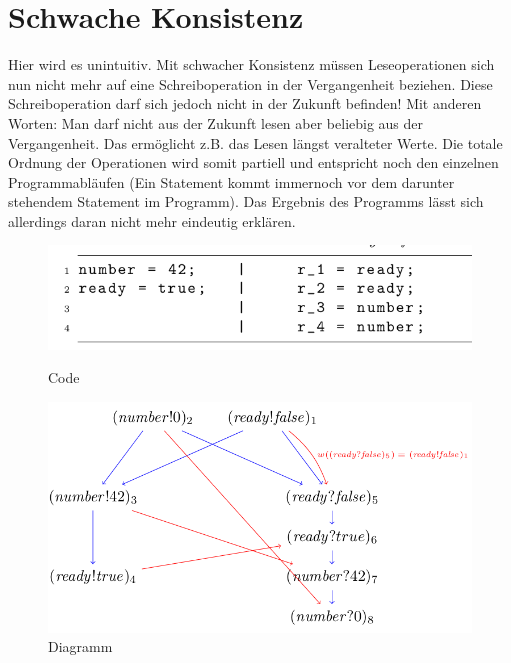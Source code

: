 \documentclass[a4paper,10pt, oneside]{book}
\begin{document}
\section{Schwache Konsistenz}
Hier wird es unintuitiv. Mit schwacher Konsistenz müssen Leseoperationen sich nun nicht mehr auf eine Schreiboperation in der Vergangenheit beziehen. Diese Schreiboperation darf sich jedoch nicht in der Zukunft befinden! Mit anderen Worten: Man darf nicht aus der Zukunft lesen aber beliebig aus der Vergangenheit. Das ermöglicht z.B. das Lesen längst veralteter Werte. Die totale Ordnung der Operationen wird somit partiell und entspricht noch den einzelnen Programmabläufen (Ein Statement kommt immernoch vor dem darunter stehendem Statement im Programm). Das Ergebnis des Programms lässt sich allerdings daran nicht mehr eindeutig erklären.

\begin{figure}[htb]
	
	\begin{minipage}[t]{0.3\linewidth}
		\centering
		\includegraphics[scale=0.3]{KompCode}
		\caption{Code}
	\end{minipage}
	\hfill
	\begin{minipage}[t]{0.6\linewidth}
		\centering
		\includegraphics[scale=0.3]{schwachDia}
		\caption{Diagramm}
	\end{minipage}
\end{figure}
\end{document}
